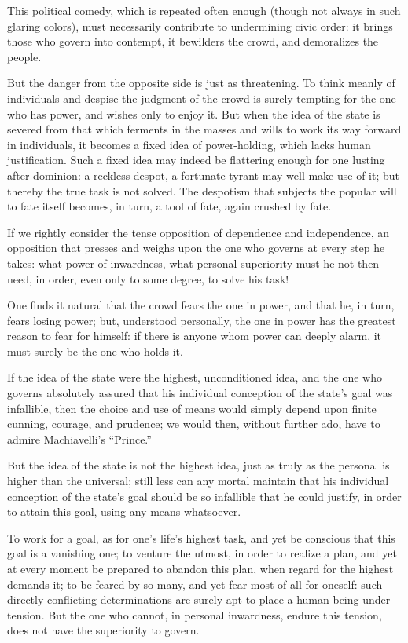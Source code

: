 \documentclass[12pt,a4paper]{book}
\begin{document}
This political comedy, which is repeated often enough (though not always in such glaring colors), must necessarily contribute to undermining civic order: it brings those who govern into contempt, it bewilders the crowd, and demoralizes the people.

But the danger from the opposite side is just as threatening. To think meanly of individuals and despise the judgment of the crowd is surely tempting for the one who has power, and wishes only to enjoy it. But when the idea of the state is severed from that which
ferments in the masses and wills to work its way forward in individuals, it becomes a fixed idea of power-holding, which lacks human justification. Such a fixed idea may indeed be flattering enough for one lusting after dominion: a reckless despot, a fortunate tyrant may well make use of it; but thereby the true task is not solved. The despotism that subjects the popular will to fate itself becomes, in turn, a tool of fate, again crushed by fate.

If we rightly consider the tense opposition of dependence and independence, an opposition that presses and weighs upon the one who governs at every step he takes: what power of inwardness, what personal superiority must he not then need, in order, even only to some degree, to solve his task!

One finds it natural that the crowd fears the one in power, and that he, in turn, fears losing power; but, understood personally, the one in power has the greatest reason to fear for himself: if there is anyone whom power can deeply alarm, it must surely be the one who holds it.

If the idea of the state were the highest, unconditioned idea, and the one who governs absolutely assured that his individual conception of the state's goal was infallible, then the choice and use of means would simply depend upon finite cunning, courage, and prudence; we would then, without further ado, have to admire Machiavelli's ``Prince.''

But the idea of the state is not the highest idea, just as truly as the personal is higher than the universal; still less can any mortal maintain that his individual conception of the state's goal should be so infallible that he could justify, in order to attain this goal, using any means whatsoever.

To work for a goal, as for one's life's highest task, and yet be conscious that this goal is a vanishing one; to venture the utmost, in order to realize a plan, and yet at every moment be prepared to abandon this plan, when
regard for the highest demands it; to be feared by so many, and yet fear most of all for oneself: such directly conflicting determinations are surely apt to place a human being under tension. But the one who cannot, in personal inwardness, endure this tension, does not have the superiority to govern.
\end{document}
